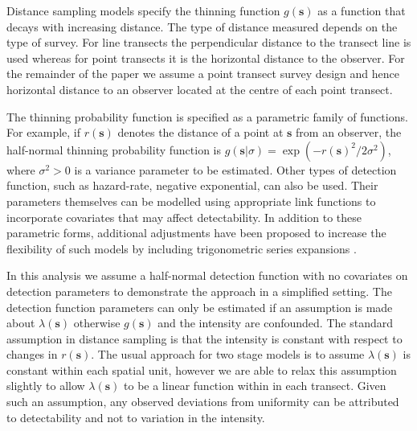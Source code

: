 \documentclass{stylefile16/statsoc}
\newcommand{\bs}{\mathbf{s}}
\begin{document}
Distance sampling models specify the thinning function $g(\bs)$ as a function that decays with increasing distance.  The type of distance measured depends on the type of survey.  For line transects the perpendicular distance to the transect line is used whereas for point transects it is the horizontal distance to the observer.  For the remainder of the paper we assume a point transect survey design and hence horizontal distance to an observer located at the centre of each point transect.  

The thinning probability function is specified as a parametric family of functions. For example, if $r(\bs)$ denotes the distance of a point at $\bs$ from an observer, the half-normal thinning probability function is $g(\bs | \sigma) = \exp(-r(\bs)^2 / 2\sigma^2)$, where $\sigma^2 > 0$ is a variance parameter to be estimated.  Other types of detection function, such as hazard-rate, negative exponential, can also be used. Their parameters themselves can be modelled using appropriate link functions to incorporate covariates that may affect detectability.  In addition to these parametric forms, additional adjustments have been proposed to increase the flexibility of such models by including trigonometric series expansions \citep{buckland_distance_2015}.  

In this analysis we assume a half-normal detection function with no covariates on detection parameters to demonstrate the approach in a simplified setting.  The detection function parameters can only be estimated if an assumption is made about $\lambda(\bs)$ otherwise $g(\bs)$ and the intensity are confounded.  The standard assumption in distance sampling is that the intensity is constant with respect to changes in $r(\bs)$. The usual approach for two stage models is to assume $\lambda(\bs)$ is constant within each spatial unit, however we are able to relax this assumption slightly to allow $\lambda(\bs)$ to be a linear function within in each transect.  Given such an assumption, any observed deviations from uniformity can be attributed to detectability and not to variation in the intensity.
\end{document}
